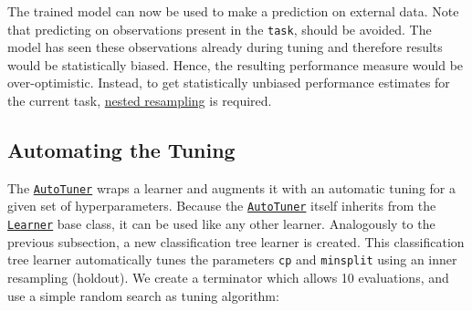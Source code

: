 \documentclass[
]{scrbook}
\newenvironment{Shaded}{\begin{snugshade}}{\end{snugshade}}
\newcommand{\AttributeTok}[1]{\textcolor[rgb]{0.77,0.63,0.00}{#1}}
\newcommand{\DecValTok}[1]{\textcolor[rgb]{0.00,0.00,0.81}{#1}}
\newcommand{\FloatTok}[1]{\textcolor[rgb]{0.00,0.00,0.81}{#1}}
\newcommand{\FunctionTok}[1]{\textcolor[rgb]{0.00,0.00,0.00}{#1}}
\newcommand{\NormalTok}[1]{#1}
\newcommand{\OtherTok}[1]{\textcolor[rgb]{0.56,0.35,0.01}{#1}}
\newcommand{\SpecialCharTok}[1]{\textcolor[rgb]{0.00,0.00,0.00}{#1}}
\newcommand{\StringTok}[1]{\textcolor[rgb]{0.31,0.60,0.02}{#1}}
\renewenvironment{Shaded} {\begin{snugshade}\small} {\end{snugshade}}
\begin{document}
The trained model can now be used to make a prediction on external data.
Note that predicting on observations present in the \texttt{task}, should be avoided.
The model has seen these observations already during tuning and therefore results would be statistically biased.
Hence, the resulting performance measure would be over-optimistic.
Instead, to get statistically unbiased performance estimates for the current task, \protect\hyperlink{nested-resampling}{nested resampling} is required.

\hypertarget{autotuner}{%
\subsection{Automating the Tuning}\label{autotuner}}

The \href{https://mlr3tuning.mlr-org.com/reference/AutoTuner.html}{\texttt{AutoTuner}} wraps a learner and augments it with an automatic tuning for a given set of hyperparameters.
Because the \href{https://mlr3tuning.mlr-org.com/reference/AutoTuner.html}{\texttt{AutoTuner}} itself inherits from the \href{https://mlr3.mlr-org.com/reference/Learner.html}{\texttt{Learner}} base class, it can be used like any other learner.
Analogously to the previous subsection, a new classification tree learner is created.
This classification tree learner automatically tunes the parameters \texttt{cp} and \texttt{minsplit} using an inner resampling (holdout).
We create a terminator which allows 10 evaluations, and use a simple random search as tuning algorithm:

\begin{Shaded}
\end{Shaded}
\end{document}
